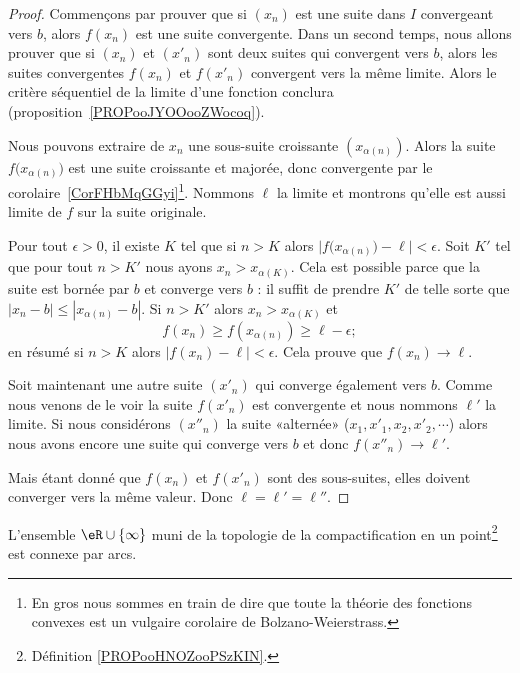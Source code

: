 \begin{proof}
	Commençons par prouver que si \( (x_n)\) est une suite dans \( I\) convergeant vers \( b\), alors \( f(x_n)\) est une suite convergente. Dans un second temps, nous allons prouver que si \( (x_n)\) et \( (x'_n)\) sont deux suites qui convergent vers \( b\), alors les suites convergentes \( f(x_n)\) et \( f(x'_n)\) convergent vers la même limite. Alors le critère séquentiel de la limite d'une fonction conclura (proposition~\ref{PROPooJYOOooZWocoq}).

	Nous pouvons extraire de \( x_n\) une sous-suite croissante \( (x_{\alpha(n)})\). Alors la suite \( f\big( x_{\alpha(n)} \big)\) est une suite croissante et majorée, donc convergente par le corolaire~\ref{CorFHbMqGGyi}\footnote{En gros nous sommes en train de dire que toute la théorie des fonctions convexes est un vulgaire corolaire de Bolzano-Weierstrass.}. Nommons \( \ell\) la limite et montrons qu'elle est aussi limite de \( f\) sur la suite originale.

	Pour tout \( \epsilon>0\), il existe \( K\) tel que si \( n>K\) alors \( \big| f\big( x_{\alpha(n)} \big)-\ell \big|<\epsilon\). Soit \( K'\) tel que pour tout \( n>K'\) nous ayons \( x_n>x_{\alpha(K)}\). Cela est possible parce que la suite est bornée par \( b\) et converge vers \( b\) : il suffit de prendre \( K'\) de telle sorte que \( | x_n-b |\leq | x_{\alpha(n)}-b |\). Si \( n>K'\) alors \( x_n>x_{\alpha(K)}\) et
	\begin{equation}
		f(x_n)\geq f(x_{\alpha(n)})\geq \ell-\epsilon;
	\end{equation}
	en résumé si \( n>K\) alors \( | f(x_n)-\ell |<\epsilon\). Cela prouve que \( f(x_n)\to\ell\).

	Soit maintenant une autre suite \( (x'_n)\) qui converge également vers \( b\). Comme nous venons de le voir la suite \( f(x'_n)\) est convergente et nous nommons \( \ell'\) la limite. Si nous considérons \( (x''_n)\) la suite «alternée» (\( x_1,x'_1,x_2,x'_2,\cdots\)) alors nous avons encore une suite qui converge vers \( b\) et donc \( f(x''_n)\to \ell'\).

	Mais étant donné que \( f(x_n)\) et \( f(x'_n)\) sont des sous-suites, elles doivent converger vers la même valeur. Donc \( \ell=\ell'=\ell''\).
\end{proof}


\begin{proposition}      \label{PROPooLOQVooULDhZz}
	L'ensemble \( \eR\cup\{ \infty \}\) muni de la topologie de la compactification en un point\footnote{Définition \ref{PROPooHNOZooPSzKIN}.} est connexe par arcs.
\end{proposition}

